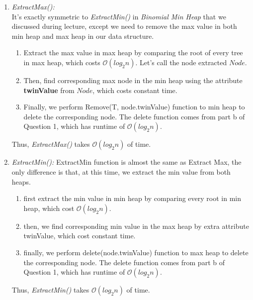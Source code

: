 \documentclass[10pt]{article}
\begin{document}
\begin{enumerate}
\begin{enumerate}
\item \textit{ExtractMax():}\\
It's exactly symmetric to \textit{ExtractMin()} in \textit{Binomial Min Heap} that we discussed during lecture, except we need to remove the max value in both min heap and max heap in our data structure.
\begin{enumerate}
\item Extract the max value in max heap by comparing the root of every tree in max heap, which costs $\mathcal{O}(log_2n)$. Let's call the node extracted $Node$.
\item Then, find corresponding max node in the min heap using the attribute \textbf{twinValue} from $Node$, which costs constant time.
\item Finally, we perform Remove(T, node.twinValue) function to min heap to delete the corresponding node. The delete function comes from part b of Question 1, which has runtime of $\mathcal{O}(log_2n)$.
\end{enumerate}

Thus, \textit{ExtractMax()} takes $\mathcal{O}( log_2n)$ of time.

\item \textit{ExtractMin():}
ExtractMin function is almost the same as Extract Max, the only difference is that, at this time, we extract the min value from both heaps.
\begin{enumerate}
\item first extract the min value in min heap by comparing every root in min heap, which cost $\mathcal{O}(log_2n)$.
\item then, we find corresponding min value in the max heap by extra attribute twinValue, which cost constant time.
\item finally, we perform delete(node.twinValue) function to max heap to delete the corresponding node. The delete function comes from part b of Question 1, which has runtime of $\mathcal{O}(log_2n)$.
\end{enumerate}

Thus, \textit{ExtractMin()} takes $\mathcal{O}( log_2n)$ of time.
\end{enumerate}
\end{enumerate}
\newpage
\end{document}
